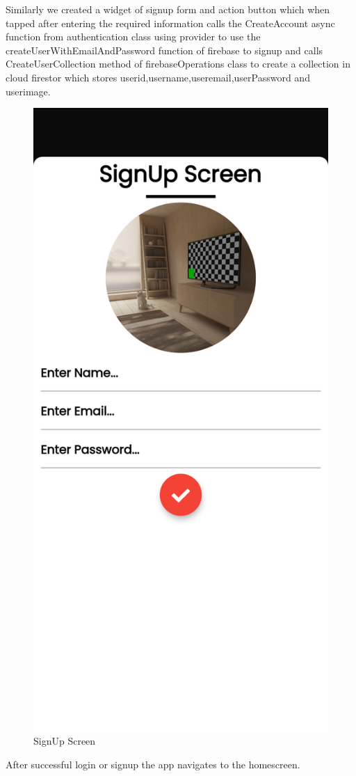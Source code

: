 Similarly we created a widget of signup form and action button which when tapped after entering the required information calls the CreateAccount async function from authentication class using provider to use the createUserWithEmailAndPassword function of firebase to signup and calls CreateUserCollection method of firebaseOperations class to create a collection in cloud firestor which stores userid,username,useremail,userPassword and userimage.
\begin{figure}[H]
    \centering
    \includegraphics[scale=0.11]{App Screenshots/Sign up Screen.png}
    \caption{SignUp Screen}
    \label{fig:Sign-up Screen}
\end{figure}
After successful login or signup the app navigates to the homescreen.

